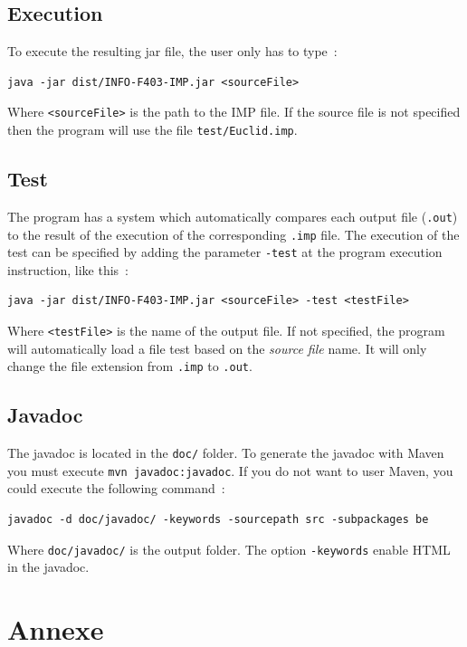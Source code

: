 \documentclass[a4paper,11pt]{article}
\begin{document}
  \subsection{Execution}
    To execute the resulting jar file, the user only has to type~:
    \begin{verbatim}
java -jar dist/INFO-F403-IMP.jar <sourceFile>
    \end{verbatim}
    Where \verb|<sourceFile>| is the path to the IMP file. If the source file is not specified then the program will use the file \verb|test/Euclid.imp|.
    
  \subsection{Test}
    The program has a system which automatically compares each output file (\verb|.out|) to the result of the execution of the corresponding \verb|.imp| file. The execution of the test can be specified by adding the parameter \verb|-test| at the program execution instruction, like this~:
    \begin{verbatim}
java -jar dist/INFO-F403-IMP.jar <sourceFile> -test <testFile>\end{verbatim}
    Where \verb|<testFile>| is the name of the output file. If not specified, the program will automatically load a file test based on the \textit{source file} name. It will only change the file extension from \verb|.imp| to \verb|.out|.
    
    
  \subsection{Javadoc}
    The javadoc is located in the \verb|doc/| folder. To generate the javadoc with Maven you must execute \verb|mvn javadoc:javadoc|.  If you do not want to user Maven, you could execute the following command~:
    \begin{verbatim}
javadoc -d doc/javadoc/ -keywords -sourcepath src -subpackages be
    \end{verbatim}
    Where \verb|doc/javadoc/| is the output folder. The option \verb|-keywords| enable HTML in the javadoc.

\section{Annexe}
\end{document}
